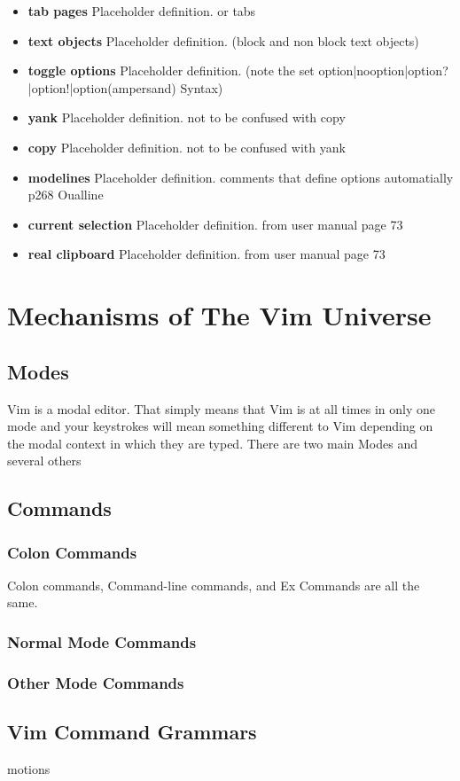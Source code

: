 \documentclass[12pt, oneside]{book}
\begin{document}
\begin{itemize}[leftmargin=*, label={}]
  \item \textbf{tab pages} Placeholder definition.  or tabs
  \item \textbf{text objects} Placeholder definition.  (block and non block text objects)
  \item \textbf{toggle options} Placeholder definition.  (note the set option|nooption|option?|option!|option(ampersand) Syntax)
  \item \textbf{yank} Placeholder definition. not to be confused with copy
  \item \textbf{copy} Placeholder definition. not to be confused with yank
  \item \textbf{modelines} Placeholder definition.  comments that define options automatially p268 Oualline
  \item \textbf{current selection} Placeholder definition.  from user manual page 73
  \item \textbf{real clipboard} Placeholder definition.  from user manual page 73
\end{itemize}

\chapter{Mechanisms of The Vim Universe}
\section{Modes}
Vim is a modal editor.  That simply means that Vim is at all times in only one mode and your keystrokes will mean something different to Vim depending on the modal context in which they are typed.  There
are two main Modes and several others
\section{Commands}
  \subsection{Colon Commands}
  Colon commands, Command-line commands, and Ex Commands are all the same.
  \subsection{Normal Mode Commands}
  \subsection{Other Mode Commands}
\section{Vim Command Grammars}
motions
\end{document}
